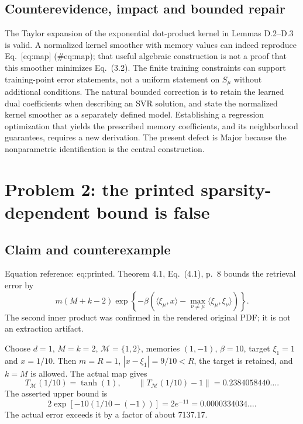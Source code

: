 \documentclass[10pt]{article}
\begin{document}
\subsection*{Counterevidence, impact and bounded repair}
The Taylor expansion of the exponential dot-product kernel in Lemmas D.2–D.3 is valid. A normalized kernel smoother with memory values can indeed reproduce Eq. [eq:map] (\#eq:map); that useful algebraic construction is not a proof that this smoother minimizes Eq. (3.2). The finite training constraints can support training-point error statements, not a uniform statement on \(S_\mu\) without additional conditions. The natural bounded correction is to retain the learned dual coefficients when describing an SVR solution, and state the normalized kernel smoother as a separately defined model. Establishing a regression optimization that yields the prescribed memory coefficients, and its neighborhood guarantees, requires a new derivation. The present defect is Major because the nonparametric identification is the central construction.\par
\section*{Problem 2: the printed sparsity-dependent bound is false}
\subsection*{Claim and counterexample}
Equation reference: eq:printed. Theorem 4.1, Eq. (4.1), p. 8 bounds the retrieval error by \[
 m(M+k-2)\exp\left\{-\beta\left(
 \langle\xi_\mu,x\rangle-\max_{\nu\ne\mu}\langle\xi_\mu,\xi_\nu\rangle
 \right)\right\}.\] The second inner product was confirmed in the rendered original PDF; it is not an extraction artifact.\par
Choose \(d=1\), \(M=k=2\), \(\mathcal M=\{1,2\}\), memories \((1,-1)\), \(\beta=10\), target \(\xi_1=1\) and \(x=1/10\). Then \(m=R=1\), \(|x-\xi_1|=9/10<R\), the target is retained, and \(k=M\) is allowed. The actual map gives \[T_\mathcal M(1/10)=\tanh(1),\qquad
 \left\lVert T_\mathcal M(1/10)-1\right\rVert=0.2384058440\ldots.\] The asserted upper bound is \[2\exp[-10(1/10-(-1))]=2e^{-11}
 =0.0000334034\ldots .\] The actual error exceeds it by a factor of about 7137.17.\par
\end{document}
